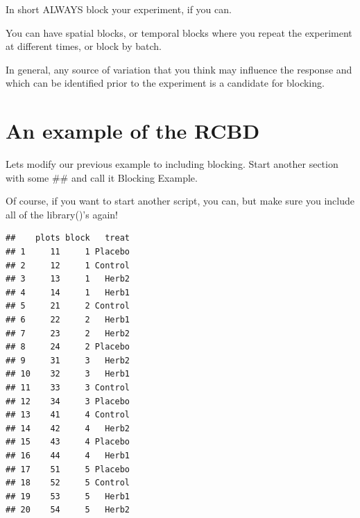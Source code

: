 \documentclass[
]{book}
\newenvironment{Shaded}{\begin{snugshade}}{\end{snugshade}}
\newcommand{\AttributeTok}[1]{\textcolor[rgb]{0.77,0.63,0.00}{#1}}
\newcommand{\CommentTok}[1]{\textcolor[rgb]{0.56,0.35,0.01}{\textit{#1}}}
\newcommand{\DecValTok}[1]{\textcolor[rgb]{0.00,0.00,0.81}{#1}}
\newcommand{\FunctionTok}[1]{\textcolor[rgb]{0.00,0.00,0.00}{#1}}
\newcommand{\NormalTok}[1]{#1}
\newcommand{\OtherTok}[1]{\textcolor[rgb]{0.56,0.35,0.01}{#1}}
\newcommand{\SpecialCharTok}[1]{\textcolor[rgb]{0.00,0.00,0.00}{#1}}
\newcommand{\StringTok}[1]{\textcolor[rgb]{0.31,0.60,0.02}{#1}}
\begin{document}
In short ALWAYS block your experiment, if you can.

You can have spatial blocks, or temporal blocks where you repeat the experiment at different times, or block by batch.

In general, any source of variation that you think may influence the response and which can be identified prior to the experiment is a candidate for blocking.

\hypertarget{an-example-of-the-rcbd}{%
\section{An example of the RCBD}\label{an-example-of-the-rcbd}}

Lets modify our previous example to including blocking. Start another section with some \#\# and call it Blocking Example.

Of course, if you want to start another script, you can, but make sure you include all of the library()'s again!

\begin{Shaded}
\end{Shaded}

\begin{verbatim}
##    plots block   treat
## 1     11     1 Placebo
## 2     12     1 Control
## 3     13     1   Herb2
## 4     14     1   Herb1
## 5     21     2 Control
## 6     22     2   Herb1
## 7     23     2   Herb2
## 8     24     2 Placebo
## 9     31     3   Herb2
## 10    32     3   Herb1
## 11    33     3 Control
## 12    34     3 Placebo
## 13    41     4 Control
## 14    42     4   Herb2
## 15    43     4 Placebo
## 16    44     4   Herb1
## 17    51     5 Placebo
## 18    52     5 Control
## 19    53     5   Herb1
## 20    54     5   Herb2
\end{verbatim}
\end{document}
